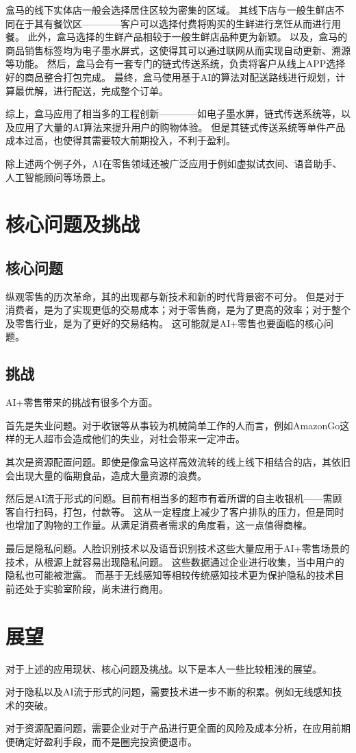 \documentclass[10pt,twocolumn,letterpaper]{article}
\begin{document}
盒马的线下实体店一般会选择居住区较为密集的区域。
其线下店与一般生鲜店不同在于其有餐饮区————客户可以选择付费将购买的生鲜进行烹饪从而进行用餐。
此外，盒马选择的生鲜产品相较于一般生鲜店品种更为新颖。
以及，盒马的商品销售标签均为电子墨水屏式，这使得其可以通过联网从而实现自动更新、溯源等功能。
然后，盒马会有一套专门的链式传送系统，负责将客户从线上APP选择好的商品整合打包完成。
最终，盒马使用基于AI的算法对配送路线进行规划，计算最优解，进行配送，完成整个订单。

综上，盒马应用了相当多的工程创新————如电子墨水屏，链式传送系统等，以及应用了大量的AI算法来提升用户的购物体验。
但是其链式传送系统等单件产品成本过高，也使得其需要较大前期投入，不利于盈利。


除上述两个例子外，AI在零售领域还被广泛应用于例如虚拟试衣间、语音助手、人工智能顾问等场景上。


\section{核心问题及挑战}

\subsection{核心问题}
纵观零售的历次革命，其的出现都与新技术和新的时代背景密不可分。
但是对于消费者，是为了实现更低的交易成本；对于零售商，是为了更高的效率；对于整个及零售行业，是为了更好的交易结构。
这可能就是AI+零售也要面临的核心问题。

\subsection{挑战}
AI+零售带来的挑战有很多个方面。

首先是失业问题。对于收银等从事较为机械简单工作的人而言，例如AmazonGo这样的无人超市会造成他们的失业，对社会带来一定冲击。

其次是资源配置问题。即使是像盒马这样高效流转的线上线下相结合的店，其依旧会出现大量的临期食品，造成大量资源的浪费。

然后是AI流于形式的问题。目前有相当多的超市有着所谓的自主收银机——需顾客自行扫码，打包，付款等。
这从一定程度上减少了客户排队的压力，但是同时也增加了购物的工作量。从满足消费者需求的角度看，这一点值得商榷。

最后是隐私问题。人脸识别技术以及语音识别技术这些大量应用于AI+零售场景的技术，从根源上就容易出现隐私问题。
这些数据通过企业进行收集，当中用户的隐私也可能被泄露。
而基于无线感知等相较传统感知技术更为保护隐私的技术目前还处于实验室阶段，尚未进行商用。



\section{展望}

对于上述的应用现状、核心问题及挑战。以下是本人一些比较粗浅的展望。

对于隐私以及AI流于形式的问题，需要技术进一步不断的积累。例如无线感知技术的突破。

对于资源配置问题，需要企业对于产品进行更全面的风险及成本分析，在应用前期便确定好盈利手段，而不是圈完投资便退市。



{\small


}
\end{document}
